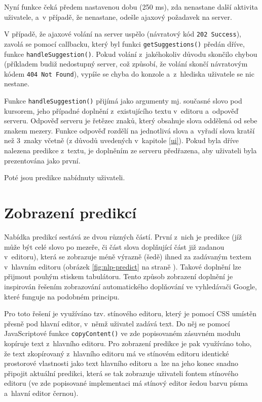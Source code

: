 \documentclass[a4paper,11pt,openany]{book} %
\begin{document}
Nyní funkce čeká předem nastavenou dobu (250 ms), zda nenastane další aktivita uživatele, a~v případě, že nenastane, odešle ajaxový požadavek na server.

V případě, že ajaxové volání na server uspělo (návratový kód {\tt 202 Success}), zavolá se pomocí callbacku, který byl funkci {\tt getSuggestions()} předán dříve, funkce {\tt handleSuggestion()}. Pokud volání z~jakéhokoliv důvodu skončilo chybou (příkladem budiž nedostupný server, což způsobí, že volání skončí návratovým kódem {\tt 404 Not Found}), vypíše se chyba do konzole a~z~hlediska uživatele se nic nestane. 

Funkce {\tt handleSuggestion()} přijímá jako argumenty mj. současné slovo pod kursorem, jeho případné doplnění z~existujícího textu v~editoru a~odpověď serveru. Odpověď serveru je řetězec znaků, který obsahuje slova oddělená od sebe znakem mezery. Funkce odpověď rozdělí na jednotlivá slova a~vyřadí slova kratší než 3~znaky včetně (z důvodů uvedených v~kapitole \ref{ui}). Pokud byla dříve nalezena predikce z~textu, je doplněním ze serveru předřazena, aby uživateli byla prezentována jako první.

Poté jsou predikce nabídnuty uživateli.

\section{Zobrazení predikcí}

Nabídka predikcí sestává ze dvou různých částí. První z~nich je predikce (jíž může být celé slovo po mezeře, či část slova doplňující část již zadanou v~editoru), která se zobrazuje méně výrazně (šedě) ihned za zadávaným textem v~hlavním editoru (obrázek \ref{fig:nlp-predict} na straně \pageref{fig:nlp-predict}). Takové doplnění lze přijmout pouhým stiskem tabulátoru. Tento způsob zobrazení doplnění je inspirován řešením zobrazování automatického doplňování ve vyhledávači Google, které funguje na podobném principu. 

Pro toto řešení je využíváno tzv. stínového editoru, který je pomocí CSS umístěn přesně pod hlavní editor, v~němž uživatel zadává text. Do něj se pomocí JavaScriptové funkce {\tt copyContent()} ve zde popisovaném zásuvném modulu kopíruje text z~hlavního editoru. Pro zobrazení predikce je pak využíváno toho, že text zkopírovaný z~hlavního editoru má ve stínovém editoru identické prostorové vlastnosti jako text hlavního editoru a~lze na jeho konec snadno připojit aktuální predikci, která se tak zobrazuje uživateli fontem stínového editoru (ve zde popisované implementaci má stínový editor šedou barvu písma a~hlavní editor černou).
\end{document}
